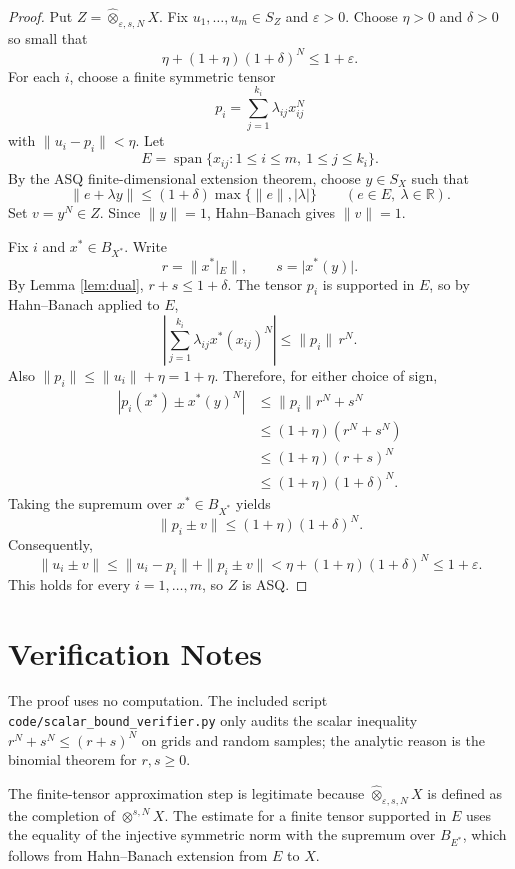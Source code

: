 \documentclass[11pt]{article}
\newcommand{\eps}{\varepsilon}
\newcommand{\Ball}{B}
\newcommand{\Sphere}{S}
\newcommand{\R}{\mathbb R}
\begin{document}
\begin{proof}
Put \(Z=\widehat{\otimes}_{\varepsilon,s,N}X\). Fix
\(u_1,\ldots,u_m\in \Sphere_Z\) and \(\eps>0\). Choose
\(\eta>0\) and \(\delta>0\) so small that
\[
  \eta+(1+\eta)(1+\delta)^N\le 1+\eps .
\]
For each \(i\), choose a finite symmetric tensor
\[
  p_i=\sum_{j=1}^{k_i}\lambda_{ij}x_{ij}^N
\]
with \(\|u_i-p_i\|<\eta\). Let
\[
  E=\operatorname{span}\{x_{ij}:1\le i\le m,\ 1\le j\le k_i\}.
\]
By the ASQ finite-dimensional extension theorem, choose \(y\in \Sphere_X\)
such that
\[
  \|e+\lambda y\|\le (1+\delta)\max\{\|e\|,|\lambda|\}
  \qquad(e\in E,\ \lambda\in\R).
\]
Set \(v=y^N\in Z\). Since \(\|y\|=1\), Hahn--Banach gives
\(\|v\|=1\).

Fix \(i\) and \(x^*\in \Ball_{X^*}\). Write
\[
  r=\|x^*|_E\|,\qquad s=|x^*(y)|.
\]
By Lemma \ref{lem:dual}, \(r+s\le 1+\delta\). The tensor \(p_i\) is
supported in \(E\), so by Hahn--Banach applied to \(E\),
\[
 \left|\sum_{j=1}^{k_i}\lambda_{ij}x^*(x_{ij})^N\right|
 \le \|p_i\|\, r^N.
\]
Also \(\|p_i\|\le \|u_i\|+\eta=1+\eta\). Therefore, for either choice of
sign,
\[
\begin{aligned}
 \left|p_i(x^*)\pm x^*(y)^N\right|
 &\le \|p_i\|r^N+s^N\\
 &\le (1+\eta)(r^N+s^N)\\
 &\le (1+\eta)(r+s)^N\\
 &\le (1+\eta)(1+\delta)^N .
\end{aligned}
\]
Taking the supremum over \(x^*\in\Ball_{X^*}\) yields
\[
  \|p_i\pm v\|\le (1+\eta)(1+\delta)^N.
\]
Consequently,
\[
  \|u_i\pm v\|
  \le \|u_i-p_i\|+\|p_i\pm v\|
  < \eta+(1+\eta)(1+\delta)^N
  \le 1+\eps .
\]
This holds for every \(i=1,\ldots,m\), so \(Z\) is ASQ.
\end{proof}

\section*{Verification Notes}

The proof uses no computation. The included script
\texttt{code/scalar\_bound\_verifier.py} only audits the scalar inequality
\(r^N+s^N\le(r+s)^N\) on grids and random samples; the analytic reason is
the binomial theorem for \(r,s\ge0\).

The finite-tensor approximation step is legitimate because
\(\widehat{\otimes}_{\varepsilon,s,N}X\) is defined as the completion of
\(\otimes^{s,N}X\). The estimate for a finite tensor supported in \(E\)
uses the equality of the injective symmetric norm with the supremum over
\(\Ball_{E^*}\), which follows from Hahn--Banach extension from \(E\) to \(X\).
\end{document}
